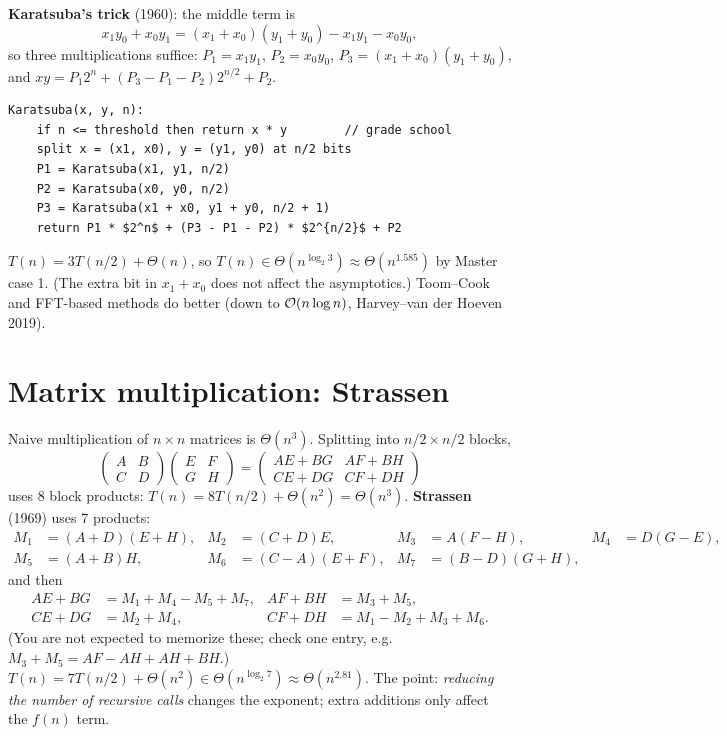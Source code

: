 \textbf{Karatsuba's trick} (1960): the middle term is
\[
x_1y_0+x_0y_1=(x_1+x_0)(y_1+y_0)-x_1y_1-x_0y_0,
\]
so three multiplications suffice: $P_1=x_1y_1$, $P_2=x_0y_0$, $P_3=(x_1+x_0)(y_1+y_0)$, and
$xy=P_1 2^n+(P_3-P_1-P_2)2^{n/2}+P_2$.
\begin{lstlisting}[style=pseudo]
Karatsuba(x, y, n):
    if n <= threshold then return x * y        // grade school
    split x = (x1, x0), y = (y1, y0) at n/2 bits
    P1 = Karatsuba(x1, y1, n/2)
    P2 = Karatsuba(x0, y0, n/2)
    P3 = Karatsuba(x1 + x0, y1 + y0, n/2 + 1)
    return P1 * $2^n$ + (P3 - P1 - P2) * $2^{n/2}$ + P2
\end{lstlisting}
$T(n)=3T(n/2)+\Theta(n)$, so $T(n)\in\Theta(n^{\log_2 3})\approx\Theta(n^{1.585})$ by Master case 1.
(The extra bit in $x_1+x_0$ does not affect the asymptotics.)
Toom--Cook and FFT-based methods do better (down to $\mathcal{O}(n\log n)$, Harvey--van der Hoeven 2019).

\section{Matrix multiplication: Strassen}
Naive multiplication of $n\times n$ matrices is $\Theta(n^3)$. Splitting into $n/2\times n/2$ blocks,
\[
\begin{pmatrix}A&B\\C&D\end{pmatrix}\begin{pmatrix}E&F\\G&H\end{pmatrix}
=\begin{pmatrix}AE+BG & AF+BH\\ CE+DG & CF+DH\end{pmatrix}
\]
uses 8 block products: $T(n)=8T(n/2)+\Theta(n^2)=\Theta(n^3)$.
\textbf{Strassen} (1969) uses 7 products:
\begin{align*}
M_1&=(A+D)(E+H), & M_2&=(C+D)E, & M_3&=A(F-H), & M_4&=D(G-E),\\
M_5&=(A+B)H, & M_6&=(C-A)(E+F), & M_7&=(B-D)(G+H),
\end{align*}
and then
\begin{align*}
AE+BG&=M_1+M_4-M_5+M_7, & AF+BH&=M_3+M_5,\\
CE+DG&=M_2+M_4, & CF+DH&=M_1-M_2+M_3+M_6.
\end{align*}
(You are not expected to memorize these; check one entry, e.g.\ $M_3+M_5=AF-AH+AH+BH$.)
$T(n)=7T(n/2)+\Theta(n^2)\in\Theta(n^{\log_2 7})\approx\Theta(n^{2.81})$.
The point: \emph{reducing the number of recursive calls} changes the exponent; extra additions only affect the $f(n)$ term.

